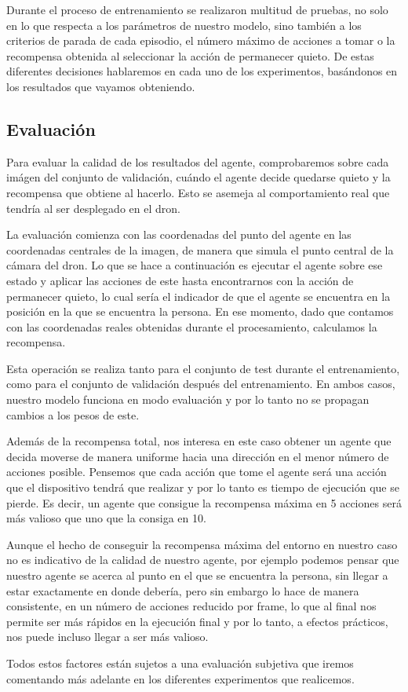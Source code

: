 Durante el proceso de entrenamiento se realizaron multitud de pruebas, no solo en lo que respecta a los parámetros de nuestro modelo, sino también a los criterios de parada de cada episodio, el número máximo de acciones a tomar o la recompensa obtenida al seleccionar la acción de permanecer quieto. De estas diferentes decisiones hablaremos en cada uno de los experimentos, basándonos en los resultados que vayamos obteniendo.
\medskip

\subsection{Evaluación}
\label{evaluacion}

Para evaluar la calidad de los resultados del agente, comprobaremos sobre cada imágen del conjunto de validación, cuándo el agente decide quedarse quieto y la recompensa que obtiene al hacerlo. Esto se asemeja al comportamiento real que tendría al ser desplegado en el dron.
\medskip

La evaluación comienza con las coordenadas del punto del agente en las coordenadas centrales de la imagen, de manera que simula el punto central de la cámara del dron. Lo que se hace a continuación es ejecutar el agente sobre ese estado y aplicar las acciones de este hasta encontrarnos con la acción de permanecer quieto, lo cual sería el indicador de que el agente se encuentra en la posición en la que se encuentra la persona. En ese momento, dado que contamos con las coordenadas reales obtenidas durante el procesamiento, calculamos la recompensa.
\medskip

Esta operación se realiza tanto para el conjunto de test durante el entrenamiento, como para el conjunto de validación después del entrenamiento. En ambos casos, nuestro modelo funciona en modo evaluación y por lo tanto no se propagan cambios a los pesos de este.
\medskip

Además de la recompensa total, nos interesa en este caso obtener un agente que decida moverse de manera uniforme hacia una dirección en el menor número de acciones posible. Pensemos que cada acción que tome el agente será una acción que el dispositivo tendrá que realizar y por lo tanto es tiempo de ejecución que se pierde. Es decir, un agente que consigue la recompensa máxima en 5 acciones será más valioso que uno que la consiga en 10.
\medskip

Aunque el hecho de conseguir la recompensa máxima del entorno en nuestro caso no es indicativo de la calidad de nuestro agente, por ejemplo podemos pensar que nuestro agente se acerca al punto en el que se encuentra la persona, sin llegar a estar exactamente en donde debería, pero sin embargo lo hace de manera consistente, en un número de acciones reducido por frame, lo que al final nos permite ser más rápidos en la ejecución final y por lo tanto, a efectos prácticos, nos puede incluso llegar a ser más valioso.
\medskip

Todos estos factores están sujetos a una evaluación subjetiva que iremos comentando más adelante en los diferentes experimentos que realicemos.